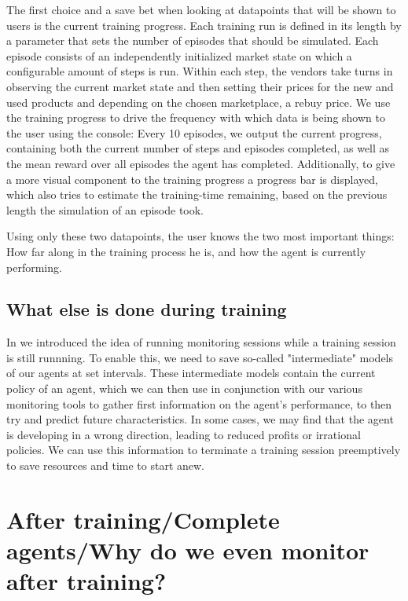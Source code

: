 The first choice and a save bet when looking at datapoints that will be shown to users is the current training progress. Each training run is defined in its length by a parameter that sets the number of episodes that should be simulated. Each episode consists of an independently initialized market state on which a configurable amount of steps is run. Within each step, the vendors take turns in observing the current market state and then setting their prices for the new and used products and depending on the chosen marketplace, a rebuy price. We use the training progress to drive the frequency with which data is being shown to the user using the console: Every 10 episodes, we output the current progress, containing both the current number of steps and episodes completed, as well as the mean reward over all episodes the agent has completed. Additionally, to give a more visual component to the training progress a progress bar is displayed, which also tries to estimate the training-time remaining, based on the previous length the simulation of an episode took.

Using only these two datapoints, the user knows the two most important things: How far along in the training process he is, and how the agent is currently performing.


\subsection{What else is done during training}

In  we introduced the idea of running monitoring sessions while a training session is still runnning. To enable this, we need to save so-called "intermediate" models of our agents at set intervals. These intermediate models contain the current policy of an agent, which we can then use in conjunction with our various monitoring tools to gather first information on the agent's performance, to then try and predict future characteristics. In some cases, we may find that the agent is developing in a wrong direction, leading to reduced profits or irrational policies. We can use this information to terminate a training session preemptively to save resources and time to start anew.

\section{After training/Complete agents/Why do we even monitor after training?}

